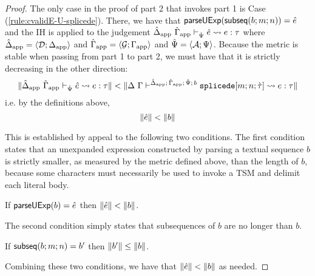 \begin{proof}
The only case in the proof of part 2 that invokes part 1 is Case (\ref{rule:cvalidE-U-splicede}). There, we have that $\mathsf{parseUExp}(\mathsf{subseq}(b; m; n))={\hat e}$ and the IH is applied to the judgement $\hat{\Delta}_\text{app}~\hat{\Gamma}_\text{app} \vdash_{\hat{\Psi}} {\hat e} \leadsto e : \tau$ where $\hat{\Delta}_\text{app}=\langle \mathcal{D}; \Delta_\text{app} \rangle$ and $\hat{\Gamma}_\text{app}=\langle \mathcal{G}; \Gamma_\text{app} \rangle$ and $\hat{\Psi}=\langle \mathcal{A}; \Psi \rangle$. Because the metric is stable when passing from part 1 to part 2, we must have that it is strictly decreasing in the other direction:
\[\Vert \hat{\Delta}_\text{app}~\hat{\Gamma}_\text{app} \vdash_{\hat{\Psi}} {\hat e} \leadsto e : \tau \Vert < \Vert \Delta~\Gamma\vdash^{\hat{\Delta}_\text{app};\,\hat{\Gamma}_\text{app};\,\hat{\Psi};\,b} \texttt{splicede}[m; n; \grave{\tau}] \leadsto e : \tau \Vert\]
i.e. by the definitions above, 
\[\Vert {\hat e} \Vert < \Vert b \Vert\]

This is established by appeal to the following two conditions. The first condition states that an unexpanded expression constructed by parsing a textual sequence $b$ is strictly smaller, as measured by the metric defined above, than the length of $b$, because some characters must necessarily be used to invoke a TSM and delimit each literal body.
\begingroup
\def\thetheorem{\ref{condition:body-parsing}}
\begin{condition} If $\mathsf{parseUExp}(b)={\hat e}$ then $\Vert {\hat e} \Vert < \Vert b \Vert$.\end{condition}
\endgroup
The second condition simply states that subsequences of $b$ are no longer than $b$.
\begingroup
\def\thetheorem{\ref{condition:body-subsequences}}
\begin{condition} If $\mathsf{subseq}(b; m; n)=b'$ then $\Vert b' \Vert \leq \Vert b \Vert$. \end{condition}
\endgroup

Combining these two conditions, we have that $\Vert {\hat e} \Vert < \Vert b \Vert$ as needed.
\end{proof}

